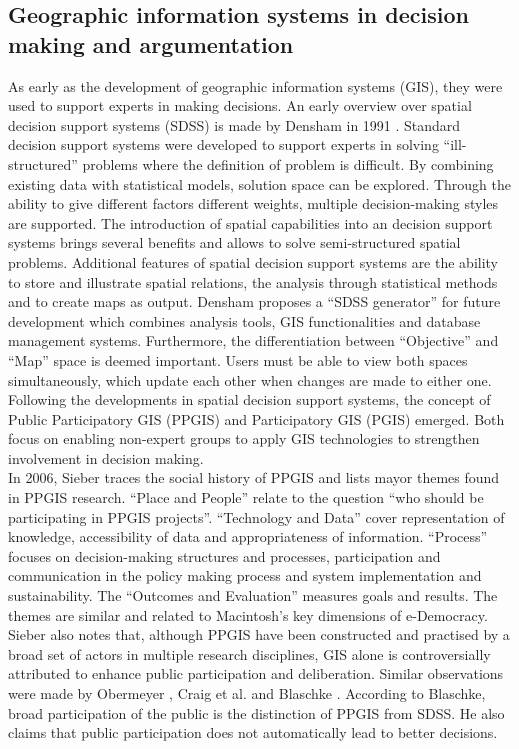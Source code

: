 \subsection{Geographic information systems in decision making and argumentation}
\label{subchap:gis_stuff}
As early as the development of geographic information systems (GIS), they were used to support experts in making decisions. An early overview over spatial decision support systems (SDSS) is made by Densham in 1991 \cite{densham_sdss}. Standard decision support systems were developed to support experts in solving ``ill-structured'' problems where the definition of problem is difficult. By combining existing data with statistical models, solution space can be explored. Through the ability to give different factors different weights, multiple decision-making styles are supported. The introduction of spatial capabilities into an decision support systems brings several benefits and allows to solve semi-structured spatial problems. Additional features of spatial decision support systems are the ability to store and illustrate spatial relations, the analysis through statistical methods and to create maps as output. Densham proposes a ``SDSS generator'' for future development which combines analysis tools, GIS functionalities and database management systems. Furthermore, the differentiation between ``Objective'' and ``Map'' space is deemed important. Users must be able to view both spaces simultaneously, which update each other when changes are made to either one.\\
Following the developments in spatial decision support systems, the concept of Public Participatory GIS (PPGIS) and Participatory GIS (PGIS) emerged. Both focus on enabling non-expert groups to apply GIS technologies to strengthen involvement in decision making.\\
In 2006, Sieber \cite{Sieber2006_PublicParticipationGIS} traces the social history of PPGIS and lists mayor themes found in PPGIS research. ``Place and People'' relate to the question ``who should be participating in PPGIS projects''. ``Technology and Data'' cover representation of knowledge, accessibility of data and appropriateness of information. ``Process'' focuses on decision-making structures and processes, participation and communication in the policy making process and system implementation and sustainability. The ``Outcomes and Evaluation'' measures goals and results. The themes are similar and related to Macintosh's \cite{Macintosh2004_eParticipation_characterization} key dimensions of e-Democracy. Sieber also notes that, although PPGIS have been constructed and practised by a broad set of actors in multiple research disciplines, GIS alone is controversially attributed to enhance public participation and deliberation. Similar observations were made by Obermeyer \cite{obermeyer1998evolution}, Craig et al. \cite{Weiner2002_Participation_and_GIS_eigentlich_Craig} and Blaschke \cite{Blaschke2004_PGIS_critically_revised}. According to Blaschke, broad participation of the public is the distinction of PPGIS from SDSS. He also claims that public participation does not automatically lead to better decisions.\\
